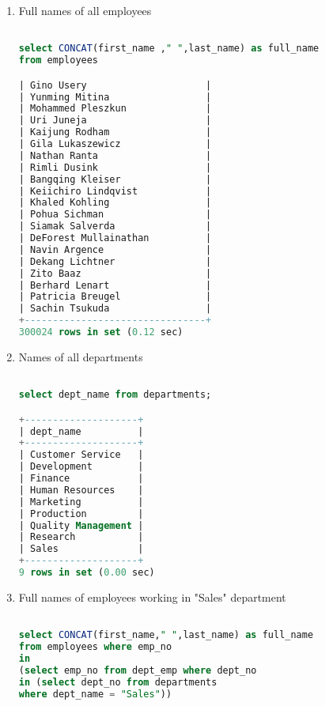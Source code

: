 \documentclass[12pt, letterpaper, twoside]{article}
\begin{document}
\begin{enumerate}
\begin{lstlisting}[language=SQL]
\end{lstlisting}

\item Full names of all employees
\begin{lstlisting}[language=SQL]

select CONCAT(first_name ," ",last_name) as full_name 
from employees

| Gino Usery                     |
| Yunming Mitina                 |
| Mohammed Pleszkun              |
| Uri Juneja                     |
| Kaijung Rodham                 |
| Gila Lukaszewicz               |
| Nathan Ranta                   |
| Rimli Dusink                   |
| Bangqing Kleiser               |
| Keiichiro Lindqvist            |
| Khaled Kohling                 |
| Pohua Sichman                  |
| Siamak Salverda                |
| DeForest Mullainathan          |
| Navin Argence                  |
| Dekang Lichtner                |
| Zito Baaz                      |
| Berhard Lenart                 |
| Patricia Breugel               |
| Sachin Tsukuda                 |
+--------------------------------+
300024 rows in set (0.12 sec)

\end{lstlisting}

\item Names of all departments
\begin{lstlisting}[language=SQL]

select dept_name from departments;

+--------------------+
| dept_name          |
+--------------------+
| Customer Service   |
| Development        |
| Finance            |
| Human Resources    |
| Marketing          |
| Production         |
| Quality Management |
| Research           |
| Sales              |
+--------------------+
9 rows in set (0.00 sec)


\end{lstlisting}

\item Full names of employees working in "Sales" department
\begin{lstlisting}[language=SQL]

select CONCAT(first_name," ",last_name) as full_name 
from employees where emp_no 
in
(select emp_no from dept_emp where dept_no 
in (select dept_no from departments 
where dept_name = "Sales"))



\end{lstlisting}
\end{enumerate}
\end{document}
